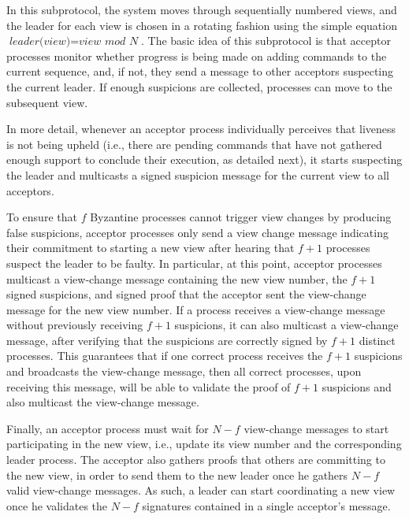 In this subprotocol, the system moves through sequentially numbered views, and the leader for each view is chosen in a rotating fashion using the simple equation $\textit{leader(view)}=\textit{view mod N}$. The basic idea of this subprotocol is that acceptor processes monitor whether progress is being made on adding commands to the current sequence, and, if not, they send a message to other acceptors suspecting the current leader. If enough suspicions are collected, processes can move to the subsequent view.

In more detail, whenever an acceptor process individually perceives that liveness is not being upheld (i.e., there are pending commands that have not gathered enough support to conclude their execution, as detailed next), it starts suspecting the leader and multicasts a signed {\sc suspicion} message for the current view to all acceptors.

To ensure that $f$ Byzantine processes cannot trigger view changes by producing  false suspicions, acceptor processes only send a view change message indicating their commitment to starting a new view after hearing that $f+1$ processes suspect the leader to be faulty. In particular, at this point, acceptor processes multicast a view-change message containing the new view number, the $f+1$ signed suspicions, and signed proof that the acceptor sent the view-change message for the new view number. If a process receives a view-change message without previously receiving $f+1$ suspicions, it can also multicast a view-change message, after verifying that the suspicions are correctly signed by $f+1$ distinct processes.
This guarantees that if one correct process receives the $f+1$ suspicions and broadcasts the view-change message, then all correct processes, upon receiving this message, will be able to validate the proof of $f+1$ suspicions and also multicast the view-change message.


Finally, an acceptor process must wait for $N-f$ view-change messages to start participating in the new view, i.e., update its view number and the corresponding leader process. The acceptor also gathers proofs that others are committing to the new view, in order to send them to the new leader once he gathers $N-f$ valid view-change messages. As such, a leader can start coordinating a new view once he validates the $N-f$ signatures contained in a single acceptor's message.

